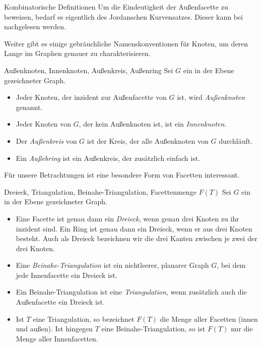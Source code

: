 \begin{section}{Kombinatorische Definitionen}
  Um die Eindeutigkeit der Außenfacette zu beweisen, bedarf es eigentlich des Jordanschen Kurvensatzes. Dieser kann bei \cite[Seite 53]{fritsch} nachgelesen werden.
  
  Weiter gibt es einige gebräuchliche Namenskonventionen für Knoten, um deren Lange im Graphen genauer zu charakterisieren.
  
  \begin{definition}{Außenknoten, Innenknoten, Außenkreis, Außenring}
   Sei $G$ ein in der Ebene gezeichneter Graph.
   \begin{itemize}
    \item Jeder Knoten, der inzident zur Außenfacette von $G$ ist, wird \textit{Außenknoten} genannt.
    \item Jeder Knoten von $G$, der kein Außenknoten ist, ist ein \textit{Innenknoten}.
    \item Der \textit{Außenkreis} von $G$ ist der Kreis, der alle Außenknoten von $G$ durchläuft.
    \item Ein \textit{Außebring} ist ein Außenkreis, der zusätzlich einfach ist.
   \end{itemize}

  \end{definition}

  Für unsere Betrachtungen ist eine besondere Form von Facetten interessant. 
  
  \begin{definition}{Dreieck, Triangulation, Beinahe-Triangulation, Facettenmenge $F(T)$}
   Sei $G$ ein in der Ebene gezeichneter Graph.
   \begin{itemize}
   \item Eine Facette ist genau dann ein \textit{Dreieck}, wenn genau drei Knoten zu ihr inzident sind. Ein Ring ist genau dann ein Dreieck, wenn er aus drei Knoten besteht. Auch als Dreieck bezeichnen wir die drei Kanten zwischen je zwei der drei Knoten.
   \item Eine \textit{Beinahe-Triangulation} ist ein nichtleerer, planarer Graph $G$, bei dem jede Innenfacette ein Dreieck ist. 
   \item Ein Beinahe-Triangulation ist eine \textit{Triangulation}, wenn zusätzlich auch die  Außenfacette ein Dreieck ist. 
   \item Ist $T$ eine Triangulation, so bezeichnet $F(T)$ die Menge aller Facetten (innen und außen). Ist hingegen $T$ eine Beinahe-Triangulation, so ist $F(T)$ nur die Menge aller Innenfacetten.
   \end{itemize}
  \end{definition}
  

\end{section}
